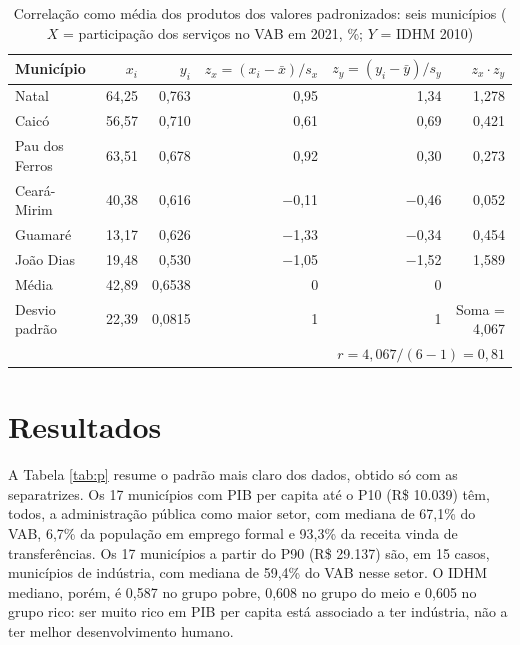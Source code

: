 \documentclass[12pt,a4paper]{article}
\newcommand{\fonte}[1]{\par\vspace{2pt}{\centering\small #1\par}\vspace{6pt}}
\begin{document}
\begin{table}[H]
\centering
\caption{Correlação como média dos produtos dos valores padronizados: seis municípios ($X$ = participação dos serviços no VAB em 2021, \%; $Y$ = IDHM 2010)}
\label{tab:z}
\footnotesize
\begin{tabular}{@{}lrrrrr@{}}
\toprule
Município & $x_i$ & $y_i$ & $z_x = (x_i - \bar{x})/s_x$ & $z_y = (y_i - \bar{y})/s_y$ & $z_x \cdot z_y$ \\
\midrule
Natal & 64,25 & 0,763 & 0,95 & 1,34 & 1,278 \\
Caicó & 56,57 & 0,710 & 0,61 & 0,69 & 0,421 \\
Pau dos Ferros & 63,51 & 0,678 & 0,92 & 0,30 & 0,273 \\
Ceará-Mirim & 40,38 & 0,616 & $-$0,11 & $-$0,46 & 0,052 \\
Guamaré & 13,17 & 0,626 & $-$1,33 & $-$0,34 & 0,454 \\
João Dias & 19,48 & 0,530 & $-$1,05 & $-$1,52 & 1,589 \\
\midrule
Média & 42,89 & 0,6538 & 0 & 0 & \\
Desvio padrão & 22,39 & 0,0815 & 1 & 1 & Soma = 4,067 \\
\multicolumn{6}{r}{$r = 4{,}067 / (6 - 1) = 0{,}81$} \\
\bottomrule
\end{tabular}
\fonte{Fonte: elaborada pelo autor (2026) com dados do IBGE (2023) e IBGE Cidades.}
\end{table}

\section{Resultados}

A Tabela \ref{tab:p} resume o padrão mais claro dos dados, obtido só com as separatrizes. Os 17 municípios com PIB per capita até o P10 (R\$ 10.039) têm, todos, a administração pública como maior setor, com mediana de 67,1\% do VAB, 6,7\% da população em emprego formal e 93,3\% da receita vinda de transferências. Os 17 municípios a partir do P90 (R\$ 29.137) são, em 15 casos, municípios de indústria, com mediana de 59,4\% do VAB nesse setor. O IDHM mediano, porém, é 0,587 no grupo pobre, 0,608 no grupo do meio e 0,605 no grupo rico: ser muito rico em PIB per capita está associado a ter indústria, não a ter melhor desenvolvimento humano.
\end{document}
